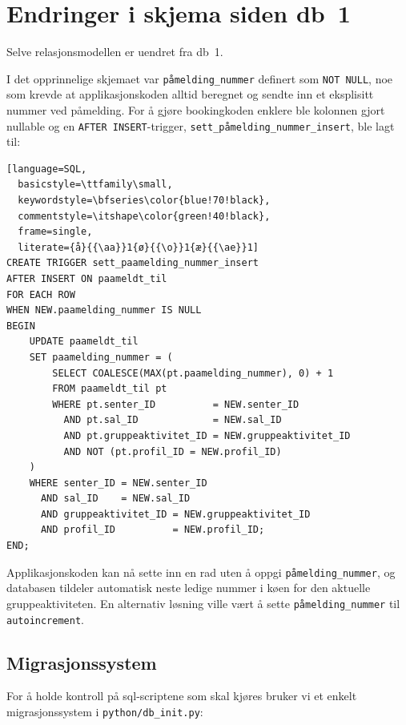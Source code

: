 \documentclass[11pt,a4paper]{article}
\begin{document}
\section{Endringer i skjema siden db~1}

Selve relasjonsmodellen er uendret fra db~1.

I det opprinnelige skjemaet var \texttt{påmelding\_nummer} definert som
\texttt{NOT NULL}, noe som krevde at applikasjonskoden alltid beregnet og
sendte inn et eksplisitt nummer ved påmelding.
For å gjøre bookingkoden enklere ble kolonnen gjort nullable og en
\texttt{AFTER INSERT}-trigger,
\texttt{sett\_påmelding\_nummer\_insert}, ble lagt til:

\begin{lstlisting}[language=SQL,
  basicstyle=\ttfamily\small,
  keywordstyle=\bfseries\color{blue!70!black},
  commentstyle=\itshape\color{green!40!black},
  frame=single,
  literate={å}{{\aa}}1{ø}{{\o}}1{æ}{{\ae}}1]
CREATE TRIGGER sett_paamelding_nummer_insert
AFTER INSERT ON paameldt_til
FOR EACH ROW
WHEN NEW.paamelding_nummer IS NULL
BEGIN
    UPDATE paameldt_til
    SET paamelding_nummer = (
        SELECT COALESCE(MAX(pt.paamelding_nummer), 0) + 1
        FROM paameldt_til pt
        WHERE pt.senter_ID          = NEW.senter_ID
          AND pt.sal_ID             = NEW.sal_ID
          AND pt.gruppeaktivitet_ID = NEW.gruppeaktivitet_ID
          AND NOT (pt.profil_ID = NEW.profil_ID)
    )
    WHERE senter_ID = NEW.senter_ID
      AND sal_ID    = NEW.sal_ID
      AND gruppeaktivitet_ID = NEW.gruppeaktivitet_ID
      AND profil_ID          = NEW.profil_ID;
END;
\end{lstlisting}

Applikasjonskoden kan nå sette inn en rad uten å oppgi
\texttt{påmelding\_nummer}, og databasen tildeler automatisk neste
ledige nummer i køen for den aktuelle gruppeaktiviteten.
En alternativ løsning ville vært å sette \texttt{påmelding\_nummer} til \texttt{autoincrement}.

\subsection*{Migrasjonssystem}

For å holde kontroll på sql-scriptene som skal kjøres bruker vi et enkelt migrasjonssystem i \texttt{python/db\_init.py}:
\end{document}
